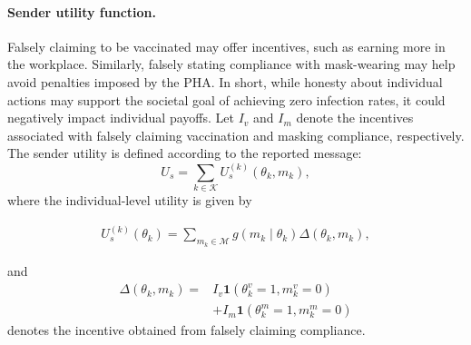 \documentclass[sigconf,review]{acmart}
\begin{document}
\paragraph{Sender utility function.} Falsely claiming to be vaccinated may offer incentives, such as earning more in the workplace. Similarly, falsely stating compliance with mask-wearing may help avoid penalties imposed by the PHA. In short, while honesty about individual actions may support the societal goal of achieving zero infection rates, it could negatively impact individual payoffs. Let $I_v$ and $I_m$ denote the incentives associated with falsely claiming vaccination and masking compliance, respectively.
The sender utility is defined according to the reported message:
\begin{equation}
U_s = \sum_{k\in\mathcal K} U_s^{(k)}(\theta_k,m_k),
\label{eq:utility}
\end{equation}
where the individual-level utility is given by



\begin{equation}
\begin{aligned}
U_s^{(k)}(\theta_k) = 
\sum_{m_k\in\mathcal M}
g(m_k\mid\theta_k)
\Delta(\theta_k,m_k),
\end{aligned}
\label{eq_sender_payoff}
\end{equation}

and
\begin{equation}
\begin{aligned}
\Delta(\theta_k,m_k)
=&
I_v \mathbf{1} (\theta_k^v=1, m_k^v=0) \\
& + I_m \mathbf{1}(\theta_k^m=1, m_k^m=0)
\end{aligned}
\label{eq:lie_gain}
\end{equation}
denotes the incentive obtained from falsely claiming compliance.
\end{document}

